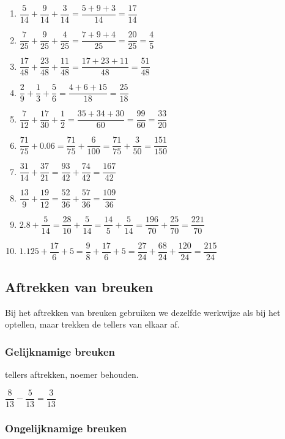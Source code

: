 \documentclass{bis}
\begin{document}
\begin{solution}
  \begin{enumerate}
    \item $\dfrac{5}{14}+\dfrac{9}{14}+\dfrac{3}{14}=\dfrac{5+9+3}{14}=\dfrac{17}{14}$
    \item $\dfrac{7}{25}+\dfrac{9}{25}+\dfrac{4}{25}=\dfrac{7+9+4}{25}=\dfrac{20}{25}=\dfrac{4}{5}$
    \item $\dfrac{17}{48}+\dfrac{23}{48}+\dfrac{11}{48}=\dfrac{17+23+11}{48}=\dfrac{51}{48}$
    \item $\dfrac{2}{9}+\dfrac{1}{3}+\dfrac{5}{6}=\dfrac{4+6+15}{18}=\dfrac{25}{18}$
    \item $\dfrac{7}{12}+\dfrac{17}{30}+\dfrac{1}{2}=\dfrac{35+34+30}{60}=\dfrac{99}{60}=\dfrac{33}{20}$
    \item $\dfrac{71}{75}+0.06=\dfrac{71}{75}+\dfrac{6}{100}=\dfrac{71}{75}+\dfrac{3}{50}=\dfrac{151}{150}$
    \item $\dfrac{31}{14}+\dfrac{37}{21}=\dfrac{93}{42}+\dfrac{74}{42}=\dfrac{167}{42}$
    \item $\dfrac{13}{9}+\dfrac{19}{12}=\dfrac{52}{36}+\dfrac{57}{36}=\dfrac{109}{36}$
    \item $2.8+\dfrac{5}{14}=\dfrac{28}{10}+\dfrac{5}{14}=\dfrac{14}{5}+\dfrac{5}{14}=\dfrac{196}{70}+\dfrac{25}{70}=\dfrac{221}{70}$
    \item $1.125+\dfrac{17}{6}+5=\dfrac{9}{8}+\dfrac{17}{6}+5=\dfrac{27}{24}+\dfrac{68}{24}+\dfrac{120}{24}=\dfrac{215}{24}$
  \end{enumerate}
\end{solution}

\subsection{Aftrekken van breuken}

Bij het aftrekken van breuken gebruiken we dezelfde werkwijze als bij het optellen, maar trekken de tellers van elkaar af.

\subsubsection{Gelijknamige breuken}

tellers aftrekken, noemer behouden.

\begin{voorbeeld}
$\dfrac{8}{13}-\dfrac{5}{13}=\dfrac{3}{13}$
\end{voorbeeld}


\subsubsection{Ongelijknamige breuken}
\end{document}

